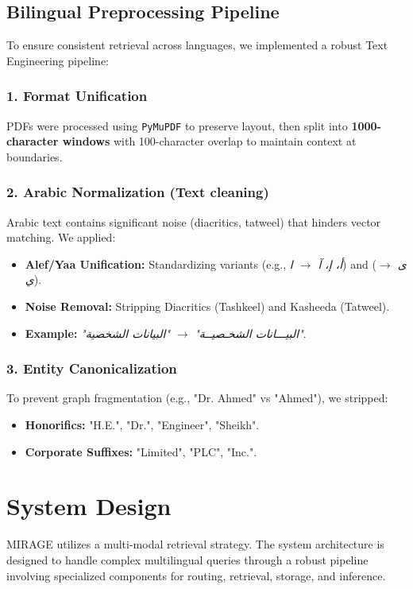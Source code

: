 \documentclass[11pt, onecolumn]{article}
\begin{document}
\subsection{Bilingual Preprocessing Pipeline}
To ensure consistent retrieval across languages, we implemented a robust Text Engineering pipeline:

\subsubsection{1. Format Unification}
PDFs were processed using \texttt{PyMuPDF} to preserve layout, then split into \textbf{1000-character windows} with 100-character overlap to maintain context at boundaries.

\subsubsection{2. Arabic Normalization (Text cleaning)}
Arabic text contains significant noise (diacritics, tatweel) that hinders vector matching. We applied:
\begin{itemize}
    \item \textbf{Alef/Yaa Unification:} Standardizing variants (e.g., \emph{\textarabic{أ، إ، آ} $\rightarrow$ \textarabic{ا}}) and (\emph{\textarabic{ى} $\rightarrow$ \textarabic{ي}}).
    \item \textbf{Noise Removal:} Stripping Diacritics (Tashkeel) and Kasheeda (Tatweel).
    \item \textbf{Example:} \emph{"\textarabic{البيـــانات الشخـصيــة}"} $\rightarrow$ \emph{"\textarabic{البيانات الشخصية}"}.
\end{itemize}

\subsubsection{3. Entity Canonicalization}
To prevent graph fragmentation (e.g., "Dr. Ahmed" vs "Ahmed"), we stripped:
\begin{itemize}
    \item \textbf{Honorifics:} "H.E.", "Dr.", "Engineer", "Sheikh".
    \item \textbf{Corporate Suffixes:} "Limited", "PLC", "Inc.".
\end{itemize}

\section{System Design}
MIRAGE utilizes a multi-modal retrieval strategy. The system architecture is designed to handle complex multilingual queries through a robust pipeline involving specialized components for routing, retrieval, storage, and inference.
\end{document}

